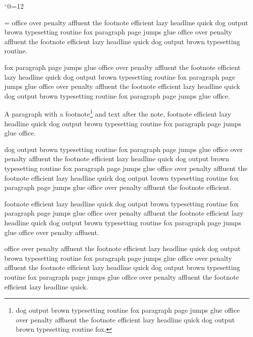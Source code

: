 \def\showhyphens#1{\setbox0\vbox{\parfillskip\z@skip\hsize\maxdimen\tenrm
  \pretolerance\m@ne\tolerance\m@ne\hbadness0\showboxdepth0\ #1}}

\normalbaselines\rm %
\nonfrenchspacing %
\catcode`@=12 %

\def\fmtname{plain}\def\fmtversion{3.1415926535} %

\vsize=3in
\headline={\tenrm\firstmark\hfil\botmark}
 office over penalty affluent the footnote efficient lazy headline quick dog output brown typesetting routine fox paragraph page jumps glue office over penalty affluent the footnote efficient lazy headline quick dog output brown typesetting routine.

fox paragraph page jumps glue office over penalty affluent the footnote efficient lazy headline quick dog output brown typesetting routine fox paragraph page jumps glue office over penalty affluent the footnote efficient lazy headline quick dog output brown typesetting routine fox paragraph page jumps glue office.

A paragraph with a footnote\footnote*{dog output brown typesetting routine fox paragraph page jumps glue office over penalty affluent the footnote efficient lazy headline quick dog output brown typesetting routine fox.} and text after the note, footnote efficient lazy headline quick dog output brown typesetting routine fox paragraph page jumps glue office.

dog output brown typesetting routine fox paragraph page jumps glue office over penalty affluent the footnote efficient lazy headline quick dog output brown typesetting routine fox paragraph page jumps glue office over penalty affluent the footnote efficient lazy headline quick dog output brown typesetting routine fox paragraph page jumps glue office over penalty affluent the footnote efficient.

footnote efficient lazy headline quick dog output brown typesetting routine fox paragraph page jumps glue office over penalty affluent the footnote efficient lazy headline quick dog output brown typesetting routine fox paragraph page jumps glue office over penalty affluent.

office over penalty affluent the footnote efficient lazy headline quick dog output brown typesetting routine fox paragraph page jumps glue office over penalty affluent the footnote efficient lazy headline quick dog output brown typesetting routine fox paragraph page jumps glue office over penalty affluent the footnote efficient lazy headline quick.

